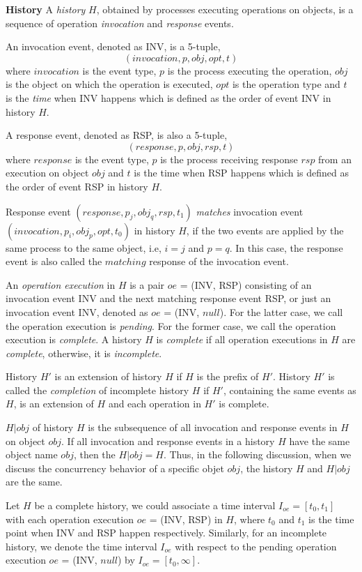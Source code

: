 \textbf{History}
A \emph{history} $H$, obtained by processes executing
operations on objects, is a sequence of operation \emph{invocation}
and \emph{response} events.

An invocation event, denoted as INV, is a 5-tuple,
$$(invocation, p, obj, opt, t)$$
where $invocation$ is the event type, $p$ is the process executing the operation, $obj$ is the object on which the operation
is executed, $opt$ is the operation type and $t$ is the \emph{time} when INV happens which is defined
as the order of event INV in history $H$.

A response event, denoted as RSP, is also a 5-tuple,
$$(response, p, obj, rsp, t)$$
where $response$ is the event type, $p$ is the process receiving response $rsp$ from an execution on object $obj$ and $t$
is the time when RSP happens which is defined as the order of event RSP in history $H$.

Response event $(response, p_j, obj_q, rsp, t_1)$ \emph{matches} invocation event $(invocation, p_i, obj_p, opt, t_0)$
in history $H$, if the two events are applied by the same process to the same object, i.e, $i = j$ and $p = q$.
In this case, the response event is also called the $matching$ response of the invocation event.

An \emph{operation execution} in $H$ is a pair $oe$ = (INV, RSP) consisting of an invocation event INV
and the next matching response event RSP, or just an invocation event INV, denoted as $oe$ = (INV, $null$).
For the latter case, we call the operation execution is \emph{pending}. For the former case, we call the operation
execution is \emph{complete}. A history $H$ is \emph{complete} if all operation executions in $H$ are \emph{complete},
otherwise, it is \emph{incomplete}.

History $H'$ is an extension of history $H$ if $H$ is the prefix of $H'$.
History $H'$ is called the \emph{completion} of incomplete history $H$ if $H'$, containing the same
events as $H$, is an extension of $H$ and each operation in $H'$ is complete.

$H|obj$ of history $H$ is the subsequence of all
invocation and response events in $H$ on object $obj$. If all invocation and response
events in a history $H$ have the same object name $obj$, then the $H|obj = H$. Thus, in the following discussion,
when we discuss the concurrency behavior of a specific objet $obj$, the history $H$ and $H|obj$ are the same.

Let $H$ be a complete history, we could associate a time interval $I_{oe} = [t_0, t_1]$ with each
operation execution $oe$ = (INV, RSP) in $H$, where $t_0$ and $t_1$ is the time point when INV and RSP happen
respectively. Similarly, for an incomplete history, we denote the time interval $I_{oe}$ with respect to the pending
operation execution $oe$ = (INV, $null$) by $I_{oe} = [t_0, \infty]$.

